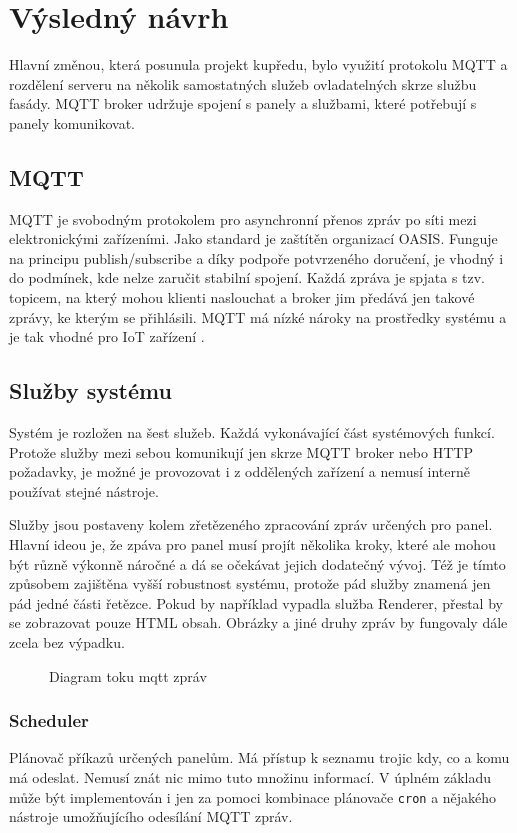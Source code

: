 \section{Výsledný návrh}
Hlavní změnou, která posunula projekt kupředu, bylo využití protokolu MQTT a rozdělení serveru na několik samostatných služeb ovladatelných skrze službu fasády. MQTT broker udržuje spojení s panely a službami, které potřebují s panely komunikovat. 

\subsection{MQTT}
MQTT je svobodným protokolem pro asynchronní přenos zpráv po síti mezi elektronickými zařízeními. Jako standard je zaštítěn organizací OASIS. Funguje na principu publish/subscribe a díky podpoře potvrzeného doručení, je vhodný i do podmínek, kde nelze zaručit stabilní spojení. Každá zpráva je spjata s tzv. topicem, na který mohou klienti naslouchat a broker jim předává jen takové zprávy, ke kterým se přihlásili. MQTT má nízké nároky na prostředky systému a je tak vhodné pro IoT zařízení \cite{MQTTStandardIoT}.

\subsection{Služby systému}
Systém je rozložen na šest služeb. Každá vykonávající část systémových funkcí. Protože služby mezi sebou komunikují jen skrze MQTT broker nebo HTTP požadavky, je možné je provozovat i z oddělených zařízení a nemusí interně používat stejné nástroje.

Služby jsou postaveny kolem zřetězeného zpracování zpráv určených pro panel. Hlavní ideou je, že zpáva pro panel musí projít několika kroky, které ale mohou být různě výkonně náročné a dá se očekávat jejich dodatečný vývoj. Též je tímto způsobem zajištěna vyšší robustnost systému, protože pád služby znamená jen pád jedné části řetězce. Pokud by například vypadla služba Renderer, přestal by se zobrazovat pouze HTML obsah. Obrázky a jiné druhy zpráv by fungovaly dále zcela bez výpadku. 

\begin{figure}[h]
    \centering
    
    \caption{Diagram toku mqtt zpráv}
    \label{fig:final-system-microservices}
\end{figure}

\subsubsection*{Scheduler}
Plánovač příkazů určených panelům. Má přístup k seznamu trojic kdy, co a komu má odeslat. Nemusí znát nic mimo tuto množinu informací. V úplném základu může být implementován i jen za pomoci kombinace plánovače \lstinline|cron| a nějakého nástroje umožňujícího odesílání MQTT zpráv.

